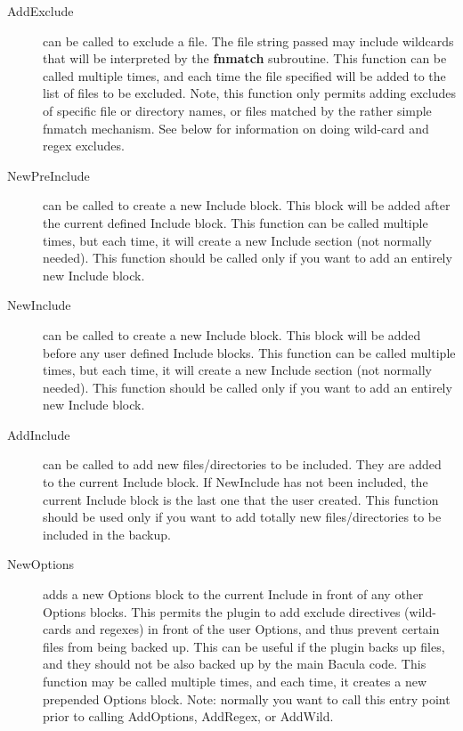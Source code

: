 \begin{description}
\item [AddExclude] can be called to exclude a file. The file
  string passed may include wildcards that will be interpreted by
  the {\bf fnmatch} subroutine. This function can be called 
  multiple times, and each time the file specified will be added
  to the list of files to be excluded. Note, this function only
  permits adding excludes of specific file or directory names,
  or files matched by the rather simple fnmatch mechanism.
  See below for information on doing wild-card and regex excludes.

\item [NewPreInclude] can be called to create a new Include block. This
  block will be added after the current defined Include block. This
  function can be called multiple times, but each time, it will create
  a new Include section (not normally needed). This function should
  be called only if you want to add an entirely new Include block.

\item [NewInclude] can be called to create a new Include block. This
  block will be added before any user defined Include blocks. This
  function can be called multiple times, but each time, it will create
  a new Include section (not normally needed). This function should
  be called only if you want to add an entirely new Include block.

\item [AddInclude] can be called to add new files/directories to
  be included.  They are added to the current Include block. If
  NewInclude has not been included, the current Include block is
  the last one that the user created. This function
  should be used only if you want to add totally new files/directories
  to be included in the backup. 

\item [NewOptions] adds a new Options block to the current Include
  in front of any other Options blocks. This permits the plugin to
  add exclude directives (wild-cards and regexes) in front of the
  user Options, and thus prevent certain files from being backed up.
  This can be useful if the plugin backs up files, and they should
  not be also backed up by the main Bacula code.  This function
  may be called multiple times, and each time, it creates a new
  prepended Options block. Note: normally you want to call this 
  entry point prior to calling AddOptions, AddRegex, or AddWild.
  

\end{description}
